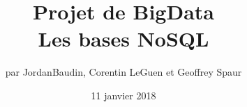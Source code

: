 \documentclass{article}
\title{Projet de BigData \\ Les bases NoSQL}
\author{par JordanBaudin, Corentin LeGuen et Geoffrey Spaur}
\date{11 janvier 2018}
\begin{document}
\maketitle
\newpage
\tableofcontents{}
\newpage

  
\end{document}
